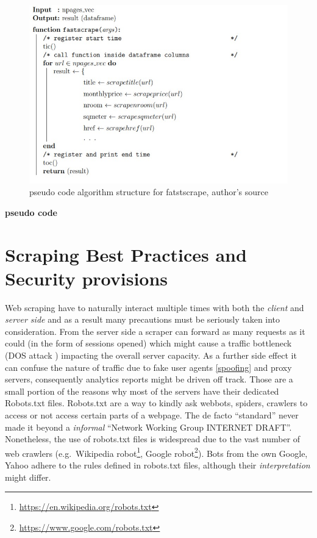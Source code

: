 \documentclass[
  12pt,
  a4paper,
  oneside]{book}
\DeclareRobustCommand{\href}[2]{#2\footnote{\url{#1}}}
\theoremstyle{definition}
\theoremstyle{definition}
\theoremstyle{definition}
\theoremstyle{remark}
\begin{document}
\begin{figure}
\centering
\includegraphics{images/pseudocode_latex/pseudocode_mainjpg.jpg}
\caption{\label{fig:pseudocode4}pseudo code algorithm structure for fatstscrape, author's source}
\end{figure}

\textbf{pseudo code}

\hypertarget{best-practices}{%
\section{Scraping Best Practices and Security provisions}\label{best-practices}}

Web scraping have to naturally interact multiple times with both the \emph{client} and \emph{server side} and as a result many precautions must be seriously taken into consideration. From the server side a scraper can forward as many requests as it could (in the form of sessions opened) which might cause a traffic bottleneck (DOS attack \citet{wiki:DOS}) impacting the overall server capacity. As a further side effect it can confuse the nature of traffic due to fake user agents \ref{spoofing} and proxy servers, consequently analytics reports might be driven off track.
Those are a small portion of the reasons why most of the servers have their dedicated Robots.txt files. Robots.txt \citet{meissner_2020} are a way to kindly ask webbots, spiders, crawlers to access or not access certain parts of a webpage. The de facto ``standard'' never made it beyond a \emph{informal} ``Network Working Group INTERNET DRAFT''. Nonetheless, the use of robots.txt files is widespread due to the vast number of web crawlers (e.g.~\href{https://en.wikipedia.org/robots.txt}{Wikipedia robot}, \href{https://www.google.com/robots.txt}{Google robot}). Bots from the own Google, Yahoo adhere to the rules defined in robots.txt files, although their \emph{interpretation} might differ.
\end{document}
